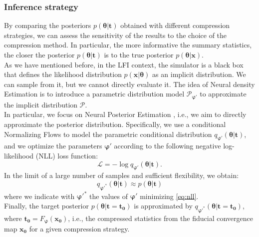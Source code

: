 \documentclass{aa}
\begin{document}
\subsubsection{Inference strategy}\label{Sec:Inference_strategy}
By comparing the posteriors $p(\bm{\theta}| \bm{t})$ obtained with different compression strategies, we can assess the sensitivity of the results to the choice of the compression method. In particular, the more informative the summary statistics, the closer the posterior $p(\bm{\theta} | \bm{t})$ is to the true posterior $p(\bm{\theta} | \bm{x})$.  \\
As we have mentioned before, in the LFI context, the simulator is a black box that defines the likelihood distribution $p(\bm{x}|\bm{\theta})$ as an implicit distribution. We can sample from it, but we cannot directly evaluate it. The idea of Neural density Estimation is to introduce a parametric distribution model $\mathcal{P}_{\bm{\varphi}'}$ to approximate the implicit distribution $\mathcal{P}$. \\
In particular, we focus on Neural Posterior Estimation \citep{npe1, npe2, npe3}, i.e., we aim to directly approximate the posterior distribution. Specifically, we use a conditional Normalizing Flows \citep{nf1, nf2} to model the parametric conditional distribution $q_{\bm{\varphi}'} (\bm{\theta} | \bm{t})$, and we optimize the parameters ${\bm{\varphi}'}$ according to the following negative log-likelihood (NLL) loss function:
\begin{equation}\label{eq:nll}
    \mathcal{L}=- \log{q_{\bm{\varphi}'}(\bm{\theta}|\bm{t})}.
\end{equation}
In the limit of a large number of samples and sufficient flexibility, we obtain:
\begin{equation}
    q_{\bm{\varphi}'^\ast}(\bm{\theta} | \bm{t}) \approx p(\bm{\theta} | \bm{t})
\end{equation}
where we indicate with $\bm{\varphi}'^\ast$ the values of $\bm{\varphi}'$ minimizing \autoref{eq:nll}. \\
Finally, the target posterior $p(\bm{\theta} | \bm{t} = \bm{t_0})$ is approximated by $q_{\bm{\varphi}'^\ast}(\bm{\theta} | \bm{t} = \bm{t_0})$, where $\bm{t_0} = F_{\bm{\varphi}}(\bm{x_0})$, i.e., the compressed statistics from the fiducial convergence map $\bm{x_0}$ for a given compression strategy.
\end{document}
